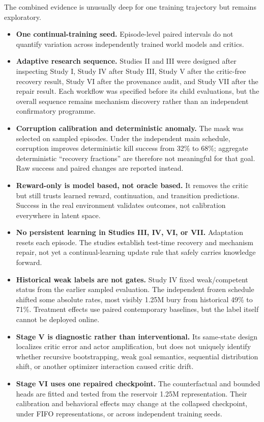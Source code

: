 \documentclass[10pt]{article}
\newcommand{\pct}[1]{#1\%}
\begin{document}
The combined evidence is unusually deep for one training trajectory but remains exploratory.
\begin{itemize}
  \item \textbf{One continual-training seed.} Episode-level paired intervals do not quantify variation across independently trained world models and critics.
  \item \textbf{Adaptive research sequence.} Studies II and III were designed after inspecting Study I, Study IV after Study III, Study V after the critic-free recovery result, Study VI after the provenance audit, and Study VII after the repair result. Each workflow was specified before its child evaluations, but the overall sequence remains mechanism discovery rather than an independent confirmatory programme.
  \item \textbf{Corruption calibration and deterministic anomaly.} The mask was selected on sampled episodes. Under the independent main schedule, corruption improves deterministic kill success from \pct{32} to \pct{68}; aggregate deterministic ``recovery fractions'' are therefore not meaningful for that goal. Raw success and paired changes are reported instead.
  \item \textbf{Reward-only is model based, not oracle based.} It removes the critic but still trusts learned reward, continuation, and transition predictions. Success in the real environment validates outcomes, not calibration everywhere in latent space.
  \item \textbf{No persistent learning in Studies III, IV, VI, or VII.} Adaptation resets each episode. The studies establish test-time recovery and mechanism repair, not yet a continual-learning update rule that safely carries knowledge forward.
  \item \textbf{Historical weak labels are not gates.} Study IV fixed weak/competent status from the earlier sampled evaluation. The independent frozen schedule shifted some absolute rates, most visibly 1.25M bury from historical \pct{49} to \pct{71}. Treatment effects use paired contemporary baselines, but the label itself cannot be deployed online.
  \item \textbf{Stage V is diagnostic rather than interventional.} Its same-state design localizes critic error and actor amplification, but does not uniquely identify whether recursive bootstrapping, weak goal semantics, sequential distribution shift, or another optimizer interaction caused critic drift.
  \item \textbf{Stage VI uses one repaired checkpoint.} The counterfactual and bounded heads are fitted and tested from the reservoir 1.25M representation. Their calibration and behavioral effects may change at the collapsed checkpoint, under FIFO representations, or across independent training seeds.

\end{itemize}
\end{document}
